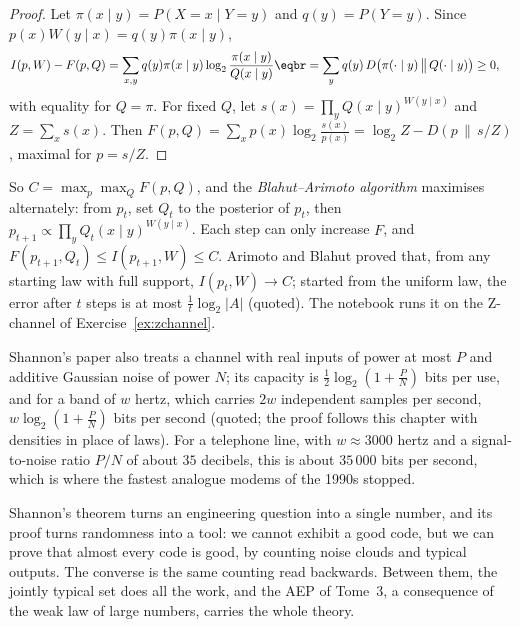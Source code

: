 \begin{proof}
Let $\pi(x\mid y)=P(X=x\mid Y=y)$ and $q(y)=P(Y=y)$. Since $p(x)W(y\mid x)=q(y)\pi(x\mid y)$,
\[
\begin{aligned}I(p,W)-F(p,Q)&=\sum_{x,y}q(y)\pi(x\mid y)\log_2\frac{\pi(x\mid y)}{Q(x\mid y)}\eqbr=\sum_yq(y)\,D\bigl(\pi(\cdot\mid y)\,\big\|\,Q(\cdot\mid y)\bigr)\ge0,\end{aligned}
\]
with equality for $Q=\pi$. For fixed $Q$, let $s(x)=\prod_yQ(x\mid y)^{W(y\mid x)}$ and $Z=\sum_xs(x)$. Then $F(p,Q)=\sum_xp(x)\log_2\frac{s(x)}{p(x)}=\log_2Z-D(p\,\|\,s/Z)$, maximal for $p=s/Z$.
\end{proof}

So $C=\max_p\max_QF(p,Q)$, and the \emph{Blahut--Arimoto algorithm} maximises alternately: from $p_t$, set $Q_t$ to the posterior of $p_t$, then $p_{t+1}\propto\prod_yQ_t(x\mid y)^{W(y\mid x)}$. Each step can only increase $F$, and $F(p_{t+1},Q_t)\le I(p_{t+1},W)\le C$. Arimoto and Blahut proved that, from any starting law with full support, $I(p_t,W)\to C$; started from the uniform law, the error after $t$ steps is at most $\frac1t\log_2|A|$ (quoted). The notebook runs it on the Z-channel of Exercise~\ref{ex:zchannel}.

\begin{remark}
Shannon's paper also treats a channel with real inputs of power at most $P$ and additive Gaussian noise of power $N$; its capacity is $\frac12\log_2(1+\frac PN)$ bits per use, and for a band of $w$ hertz, which carries $2w$ independent samples per second, $w\log_2(1+\frac PN)$ bits per second (quoted; the proof follows this chapter with densities in place of laws). For a telephone line, with $w\approx3000$ hertz and a signal-to-noise ratio $P/N$ of about $35$ decibels, this is about $35\,000$ bits per second, which is where the fastest analogue modems of the 1990s stopped.
\end{remark}

\begin{beauty}
Shannon's theorem turns an engineering question into a single number, and its proof turns randomness into a tool: we cannot exhibit a good code, but we can prove that almost every code is good, by counting noise clouds and typical outputs. The converse is the same counting read backwards. Between them, the jointly typical set does all the work, and the AEP of Tome~3, a consequence of the weak law of large numbers, carries the whole theory.
\end{beauty}

